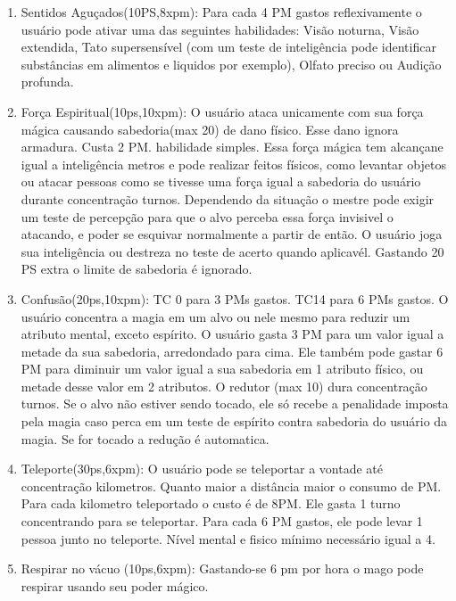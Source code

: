 \begin{enumerate}
  
  		 	\item Sentidos Aguçados(10PS,8xpm): Para cada 4 PM gastos reflexivamente o usuário pode ativar uma das seguintes habilidades: Visão noturna, Visão extendida, Tato supersensível (com um teste de inteligência pode identificar substâncias em alimentos e liquidos por exemplo), Olfato preciso ou Audição profunda.


 	\item Força Espiritual(10ps,10xpm): O usuário ataca unicamente com sua força mágica causando sabedoria(max 20) de dano físico. Esse dano ignora armadura. Custa 2 PM. habilidade simples. Essa força mágica tem alcançane igual a inteligência metros e pode realizar feitos físicos, como levantar objetos ou atacar pessoas como se tivesse uma força igual a sabedoria do usuário durante concentração turnos. Dependendo da situação o mestre pode exigir um teste de percepção para que o alvo perceba essa força invisivel o atacando, e poder se esquivar normalmente a partir de então. O usuário joga sua inteligência ou destreza no teste de acerto quando aplicavél. Gastando 20 PS extra o limite de sabedoria é ignorado.  
  	
	\item Confusão(20ps,10xpm): TC 0 para 3 PMs gastos. TC14 para 6 PMs gastos.\newline 
O usuário concentra a magia em um alvo ou nele mesmo para reduzir um atributo mental, exceto espírito. O usuário gasta 3 PM para um valor igual a metade da sua sabedoria, arredondado para cima. Ele também pode gastar 6 PM para diminuir um valor igual a sua sabedoria em 1 atributo físico, ou metade desse valor em 2 atributos. O redutor (max 10) dura concentração turnos. Se o alvo não estiver sendo tocado, ele só recebe a penalidade imposta pela magia caso perca em um teste de espírito contra sabedoria do usuário da magia. Se for tocado a redução é automatica.
  
	 	\item Teleporte(30ps,6xpm): O usuário pode se teleportar a vontade até concentração kilometros. Quanto maior a distância maior o consumo de PM. Para cada kilometro teleportado o custo é de 8PM. Ele gasta 1 turno concentrando para se teleportar. Para cada 6 PM gastos, ele pode levar 1 pessoa junto no teleporte.  Nível mental e fisico mínimo necessário igual a 4.
  
	 	\item Respirar no vácuo (10ps,6xpm): Gastando-se 6 pm por hora o mago pode respirar usando seu poder mágico. 


\end{enumerate}
